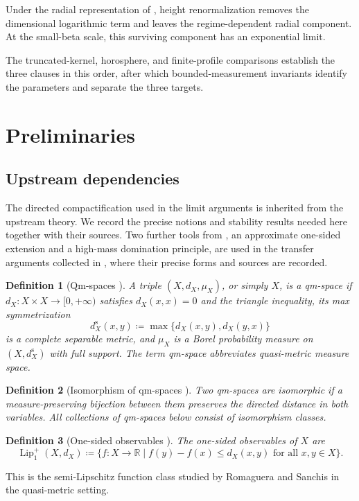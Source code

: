 \documentclass[10pt,a4paper]{amsart}
\numberwithin{equation}{section}
\newtheorem*{definition*}{Definition}
\newcommand{\R}{\mathbb R}
\newcommand{\Lipplus}{\operatorname{Lip}^{+}_{1}}
\begin{document}
Under the radial representation of , height renormalization removes the dimensional logarithmic term and leaves the regime-dependent radial component.  At the small-beta scale, this surviving component has an exponential limit.

The truncated-kernel, horosphere, and finite-profile comparisons establish the three clauses in this order, after which bounded-measurement invariants identify the parameters and separate the three targets.

\section{Preliminaries}\label{sec:preliminaries}

\subsection{Upstream dependencies}

The directed compactification used in the limit arguments is inherited from the upstream theory.  We record the precise notions and stability results needed here together with their sources.  Two further tools from \cite{one-sided-pyramids}, an approximate one-sided extension and a high-mass domination principle, are used in the transfer arguments collected in , where their precise forms and sources are recorded.

\begin{definition*}[Qm-spaces {\cite[Definition~2.2]{gds3-ja}}]
A triple $(X,d_X,\mu_X)$, or simply $X$, is a \emph{qm-space} if $d_X\colon X\times X\to[0,+\infty)$ satisfies $d_X(x,x)=0$ and the triangle inequality, its max symmetrization
\[ d_X^{\mathrm s}(x,y)\coloneqq\max\{d_X(x,y),d_X(y,x)\} \]
is a complete separable metric, and $\mu_X$ is a Borel probability measure on $(X,d_X^{\mathrm s})$ with full support.  The term qm-space abbreviates quasi-metric measure space.
\end{definition*}

\begin{definition*}[Isomorphism of qm-spaces {\cite[Definition~2.3]{gds3-ja}}]
Two qm-spaces are isomorphic if a measure-preserving bijection between them preserves the directed distance in both variables.  All collections of qm-spaces below consist of isomorphism classes.
\end{definition*}

\begin{definition*}[One-sided observables {\cite[Definition~2.5]{gds3-ja}}]
The one-sided observables of $X$ are
\[ \Lipplus(X,d_X)\coloneqq\{f\colon X\to\R\mid f(y)-f(x)\le d_X(x,y)\text{ for all }x,y\in X\}. \]
\end{definition*}
This is the semi-Lipschitz function class studied by Romaguera and Sanchis \cite{romaguera2000semi} in the quasi-metric setting.
\end{document}
